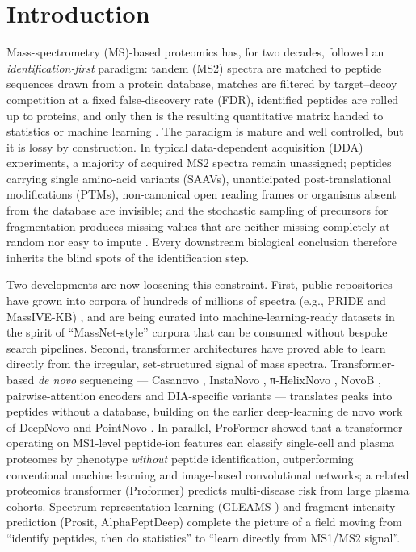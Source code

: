 \documentclass{sn-preview}
\begin{document}
\section{Introduction}\label{sec:intro}
Mass-spectrometry (MS)-based proteomics has, for two decades, followed an \emph{identification-first} paradigm: tandem (MS2) spectra are matched to peptide sequences drawn from a protein database, matches are filtered by target--decoy competition at a fixed false-discovery rate (FDR), identified peptides are rolled up to proteins, and only then is the resulting quantitative matrix handed to statistics or machine learning \cite{aebersold2016,cox2008,elias2007}. The paradigm is mature and well controlled, but it is lossy by construction. In typical data-dependent acquisition (DDA) experiments, a majority of acquired MS2 spectra remain unassigned; peptides carrying single amino-acid variants (SAAVs), unanticipated post-translational modifications (PTMs), non-canonical open reading frames or organisms absent from the database are invisible; and the stochastic sampling of precursors for fragmentation produces missing values that are neither missing completely at random nor easy to impute \cite{lazar2016,mann2021}. Every downstream biological conclusion therefore inherits the blind spots of the identification step.

Two developments are now loosening this constraint. First, public repositories have grown into corpora of hundreds of millions of spectra (e.g., PRIDE and MassIVE-KB) \cite{perez2022,wang2018}, and are being curated into machine-learning-ready datasets in the spirit of ``MassNet-style'' corpora that can be consumed without bespoke search pipelines. Second, transformer architectures \cite{vaswani2017} have proved able to learn directly from the irregular, set-structured signal of mass spectra. Transformer-based \emph{de novo} sequencing --- Casanovo \cite{yilmaz2024}, InstaNovo \cite{eloff2025}, π-HelixNovo \cite{yang2024}, NovoB \cite{lee2024}, pairwise-attention encoders \cite{lapin2025} and DIA-specific variants \cite{ebrahimi2023} --- translates peaks into peptides without a database, building on the earlier deep-learning de novo work of DeepNovo \cite{tran2017} and PointNovo \cite{qiao2021}. In parallel, ProFormer \cite{krull2026} showed that a transformer operating on MS1-level peptide-ion features can classify single-cell and plasma proteomes by phenotype \emph{without} peptide identification, outperforming conventional machine learning and image-based convolutional networks; a related proteomics transformer (Proformer) \cite{qiu2025} predicts multi-disease risk from large plasma cohorts. Spectrum representation learning (GLEAMS \cite{bittremieux2022}) and fragment-intensity prediction (Prosit, AlphaPeptDeep) \cite{gessulat2019,zeng2022} complete the picture of a field moving from ``identify peptides, then do statistics'' to ``learn directly from MS1/MS2 signal''.
\end{document}
